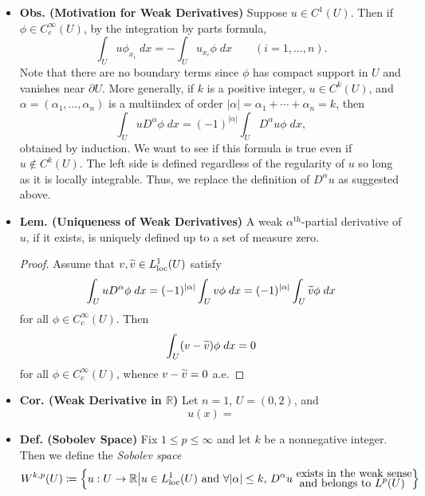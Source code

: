\documentclass{article}
\begin{document}
\begin{itemize}
		\item \textbf{Obs. (Motivation for Weak Derivatives)} Suppose $u \in C^{1}(U)$. Then if $\phi \in C_{c}^{\infty}(U)$, by the integration by parts formula, 
		\begin{equation*}
			\int_{U}u \phi_{x_{i}}\;dx = -\int_{U}u_{x_{i}}\phi\;dx \qquad (i = 1, \ldots, n). 
		\end{equation*}
		Note that there are no boundary terms since $\phi$ has compact support in $U$ and vanishes near $\partial U$. More generally, if $k$ is a positive integer, $u \in C^{k}(U)$, and $\alpha = (\alpha_{1}, \ldots, \alpha_{n})$ is a multiindex of order $|\alpha| = \alpha_{1} + \dotsm + \alpha_{n} = k$, then 
		\begin{equation*}
			\int_{U}uD^{\alpha}\phi\;dx = (-1)^{|\alpha|}\int_{U}D^{\alpha}u \phi\;dx, 
		\end{equation*}
		obtained by induction. We want to see if this formula is true even if $u \notin C^{k}(U)$. The left side is defined regardless of the regularity of $u$ so long as it is locally integrable. Thus, we replace the definition of $D^{\alpha}u$ as suggested above. 
		
		\item \textbf{Lem. (Uniqueness of Weak Derivatives)} A weak $\alpha^{\text{th}}$-partial derivative of $u$, if it exists, is uniquely defined up to a set of measure zero. 
		
		\begin{proof}
			Assume that $v, \ti{v} \in L^{1}_{\text{loc}}(U)$ satisfy 
			\begin{equation*}
				\int_{U}uD^{\alpha}\phi\;dx = (-1)^{|\alpha|}\int_{U}v\phi\;dx = (-1)^{|\alpha|}\int_{U}\ti{v}\phi\;dx
			\end{equation*}
			for all $\phi \in C_{c}^{\infty}(U)$. Then 
			\begin{equation*}
				\int_{U}(v - \ti{v})\phi\;dx = 0
			\end{equation*}
			for all $\phi \in C_{c}^{\infty}(U)$, whence $v - \ti{v} = 0$ a.e. 
		\end{proof}
		
		\item \textbf{Cor. (Weak Derivative in $\mathbb{R}$)} Let $n = 1$, $U = (0,2)$, and 
		\begin{equation*}
			u(x) = 
		\end{equation*}
		
		\item \textbf{Def. (Sobolev Space)} Fix $1 \leq p \leq \infty$ and let $k$ be a nonnegative integer. Then we define the \textit{Sobolev space}
		\begin{equation*}
			W^{k,p}(U) \coloneqq \brac*{u: U \to \mathbb{R} \bigl\vert u \in L^{1}_{\text{loc}}(U) \text{ and $\forall |\alpha|\leq k$, } D^{\alpha}u \substack{\displaystyle\text{ exists in the weak sense} \\ \displaystyle\text{and belongs to $L^{p}(U)$}}}
		\end{equation*}
	\end{itemize}
	
\end{document}
